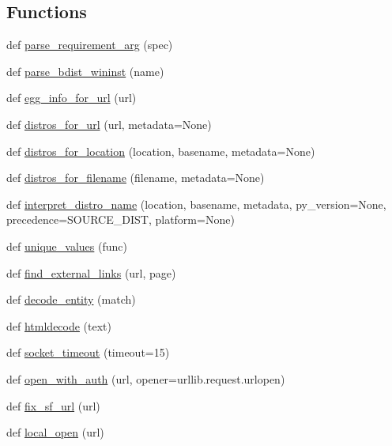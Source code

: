 \subsection*{Functions}
\begin{DoxyCompactItemize}
\item 
def \hyperlink{namespacesetuptools_1_1package__index_a98c52186d6974db3f16873072bae738b}{parse\+\_\+requirement\+\_\+arg} (spec)
\item 
def \hyperlink{namespacesetuptools_1_1package__index_a1deaaf84d6a8d1999a621f201f9df971}{parse\+\_\+bdist\+\_\+wininst} (name)
\item 
def \hyperlink{namespacesetuptools_1_1package__index_a111aa9958fee647ee3d81cb2e936c247}{egg\+\_\+info\+\_\+for\+\_\+url} (url)
\item 
def \hyperlink{namespacesetuptools_1_1package__index_a571267e6a96f3718ea07480e2e289897}{distros\+\_\+for\+\_\+url} (url, metadata=None)
\item 
def \hyperlink{namespacesetuptools_1_1package__index_ad1cc6291d57604a866381df28930408a}{distros\+\_\+for\+\_\+location} (location, basename, metadata=None)
\item 
def \hyperlink{namespacesetuptools_1_1package__index_a2038c36ec69098c4da6c0fce1550f080}{distros\+\_\+for\+\_\+filename} (filename, metadata=None)
\item 
def \hyperlink{namespacesetuptools_1_1package__index_a1efdd05a9931992ea9882621aba5d104}{interpret\+\_\+distro\+\_\+name} (location, basename, metadata, py\+\_\+version=None, precedence=S\+O\+U\+R\+C\+E\+\_\+\+D\+I\+ST, platform=None)
\item 
def \hyperlink{namespacesetuptools_1_1package__index_af5a53fb83bee4d01a3dd7e1668bccda6}{unique\+\_\+values} (func)
\item 
def \hyperlink{namespacesetuptools_1_1package__index_ae5750b097bef78b2cccd0a65c32b293e}{find\+\_\+external\+\_\+links} (url, page)
\item 
def \hyperlink{namespacesetuptools_1_1package__index_a6bc8e55badca04ff77ea91d2bd7786bc}{decode\+\_\+entity} (match)
\item 
def \hyperlink{namespacesetuptools_1_1package__index_a31f99bcf1ac5bfd133a96d93a1172078}{htmldecode} (text)
\item 
def \hyperlink{namespacesetuptools_1_1package__index_a3d3d4071a980831697f5e1495af7af16}{socket\+\_\+timeout} (timeout=15)
\item 
def \hyperlink{namespacesetuptools_1_1package__index_a7c5c00cd960eeda8764cb89731fca84a}{open\+\_\+with\+\_\+auth} (url, opener=urllib.\+request.\+urlopen)
\item 
def \hyperlink{namespacesetuptools_1_1package__index_a54de460bc10958fb74c9773ce7411128}{fix\+\_\+sf\+\_\+url} (url)
\item 
def \hyperlink{namespacesetuptools_1_1package__index_a54dcf838d95efdcc84ef4720d32be7a7}{local\+\_\+open} (url)
\end{DoxyCompactItemize}

